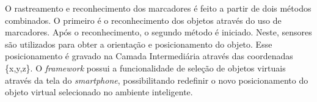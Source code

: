 	O rastreamento e reconhecimento dos marcadores é feito a partir de dois métodos combinados. O
	primeiro é o reconhecimento dos objetos através do uso de marcadores. Após o reconhecimento, o
	segundo método é iniciado. Neste, sensores são utilizados para obter a orientação e posicionamento
	do objeto. Esse posicionamento é gravado na Camada Intermediária através das coordenadas \{x,y,z\}. O
	\textit{framework} possui a funcionalidade de seleção de objetos virtuais através da tela do
	\textit{smartphone}, possibilitando redefinir o novo posicionamento do objeto virtual selecionado
	no ambiente inteligente.
	
	
	